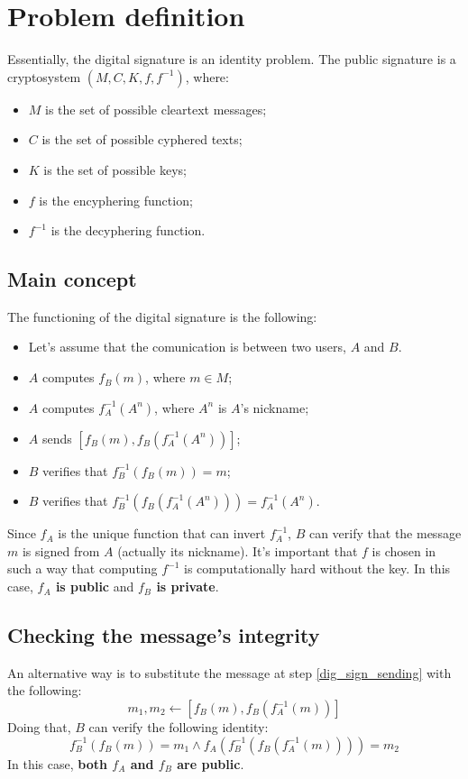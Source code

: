 \section{Problem definition}
Essentially, the digital signature is an identity problem.\newline
The public signature is a cryptosystem $(M, C, K, f, f^{-1})$, where:
\begin{itemize}
    \item $M$ is the set of possible cleartext messages;
    \item $C$ is the set of possible cyphered texts;
    \item $K$ is the set of possible keys;
    \item $f$ is the encyphering function;
    \item $f^{-1}$ is the decyphering function.
\end{itemize}
\subsection{Main concept}
The functioning of the digital signature is the following:
\begin{itemize}
    \item Let's assume that the comunication is between two users, $A$ and $B$.
    \item $A$ computes $f_{B}(m)$, where $m \in M$;
    \item $A$ computes $f_{A}^{-1}(A^{n})$, where $A^{n}$ is $A$'s nickname;
    \item $A$ sends $[f_{B}(m), f_{B}(f_{A}^{-1}(A^{n}))]$;\label{dig_sign_sending}
    \item $B$ verifies that $f_{B}^{-1}(f_{B}(m)) = m$;
    \item $B$ verifies that $f_{B}^{-1}(f_{B}(f_{A}^{-1}(A^{n}))) = f_{A}^{-1}(A^{n})$.
\end{itemize}
Since $f_{A}$ is the unique function that can invert $f_{A}^{-1}$, $B$ can verify that the message $m$ is signed from $A$ (actually its nickname). \newline
It's important that $f$ is chosen in such a way that computing $f^{-1}$ is computationally hard without the key. \newline
In this case, \textbf{$f_{A}$ is public} and \textbf{$f_{B}$ is private}.
\subsection{Checking the message's integrity}
An alternative way is to substitute the message at step \ref{dig_sign_sending} with the following:
\[
m_{1}, m_{2} \gets [f_{B}(m), f_{B}(f_{A}^{-1}(m))]
\]
Doing that, $B$ can verify the following identity:
\[
f_{B}^{-1}(f_{B}(m)) = m_{1} \land f_{A}(f_{B}^{-1}(f_{B}(f_{A}^{-1}(m)))) = m_{2}
\]
In this case, \textbf{both $f_{A}$ and $f_{B}$ are public}.

